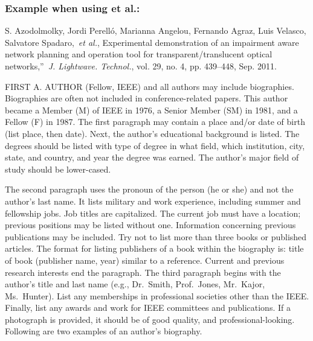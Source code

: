 \documentclass{IEEEoj}
\begin{document}
\subsubsection*{Example when using et al.:}

\begin{thebibliography}{00}
 S. Azodolmolky, Jordi Perell\'{o}, Marianna Angelou, Fernando Agraz, Luis Velasco, Salvatore Spadaro,~\textit{et al.}, Experimental demonstration of an impairment aware network planning and operation tool for transparent/translucent optical networks,''~\textit{J. Lightwave. Technol.}, vol. 29, no. 4, pp. 439--448, Sep. 2011.
\end{thebibliography}

\begin{IEEEbiography}{FIRST
A. AUTHOR } (Fellow, IEEE) and all authors may include 
biographies. Biographies are often not included in conference-related
papers. This author became a Member (M) of IEEE in 1976, a Senior
Member (SM) in 1981, and a Fellow (F) in 1987. The first paragraph may
contain a place and/or date of birth (list place, then date). Next,
the author's educational background is listed. The degrees should be
listed with type of degree in what field, which institution, city,
state, and country, and year the degree was earned. The author's major
field of study should be lower-cased. 

The second paragraph uses the pronoun of the person (he or she) and not the 
author's last name. It lists military and work experience, including summer 
and fellowship jobs. Job titles are capitalized. The current job must have a 
location; previous positions may be listed 
without one. Information concerning previous publications may be included. 
Try not to list more than three books or published articles. The format for 
listing publishers of a book within the biography is: title of book 
(publisher name, year) similar to a reference. Current and previous research 
interests end the paragraph. The third paragraph begins with the author's 
title and last name (e.g., Dr.\ Smith, Prof.\ Jones, Mr.\ Kajor, Ms.\ Hunter). 
List any memberships in professional societies other than the IEEE. Finally, 
list any awards and work for IEEE committees and publications. If a 
photograph is provided, it should be of good quality, and 
professional-looking. Following are two examples of an author's biography.
\end{IEEEbiography}
\end{document}
